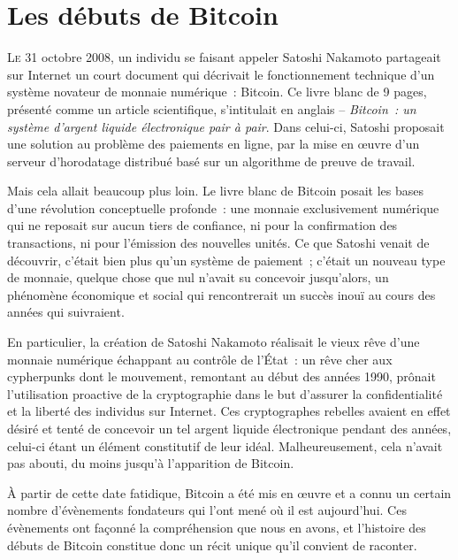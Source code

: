 
\chapter{Les débuts de Bitcoin}
\label{ch:mythe}
\label{enotezch:1}


\lettrine[]{L}e 31 octobre 2008, un individu se faisant appeler Satoshi Nakamoto partageait sur Internet un court document qui décrivait le fonctionnement technique d'un système novateur de monnaie numérique~: Bitcoin. Ce livre blanc de 9 pages, présenté comme un article scientifique, s'intitulait en anglais  -- \emph{Bitcoin~: un système d'argent liquide électronique pair à pair}. Dans celui-ci, Satoshi proposait une solution au problème des paiements en ligne, par la mise en œuvre d'un serveur d'horodatage distribué basé sur un algorithme de preuve de travail.

Mais cela allait beaucoup plus loin. Le livre blanc de Bitcoin posait les bases d'une révolution conceptuelle profonde~: une monnaie exclusivement numérique qui ne reposait sur aucun tiers de confiance, ni pour la confirmation des transactions, ni pour l'émission des nouvelles unités. Ce que Satoshi venait de découvrir, c'était bien plus qu'un système de paiement~; c'était un nouveau type de monnaie, quelque chose que nul n'avait su concevoir jusqu'alors, un phénomène économique et social qui rencontrerait un succès inouï au cours des années qui suivraient.

En particulier, la création de Satoshi Nakamoto réalisait le vieux rêve d'une monnaie numérique échappant au contrôle de l'État~: un rêve cher aux cypherpunks dont le mouvement, remontant au début des années 1990, prônait l'utilisation proactive de la cryptographie dans le but d'assurer la confidentialité et la liberté des individus sur Internet. Ces cryptographes rebelles avaient en effet désiré et tenté de concevoir un tel argent liquide électronique pendant des années, celui-ci étant un élément constitutif de leur idéal. Malheureusement, cela n'avait pas abouti, du moins jusqu'à l'apparition de Bitcoin.

À partir de cette date fatidique, Bitcoin a été mis en œuvre et a connu un certain nombre d'évènements fondateurs qui l'ont mené où il est aujourd'hui. Ces évènements ont façonné la compréhension que nous en avons, et l'histoire des débuts de Bitcoin constitue donc un récit unique qu'il convient de raconter.

